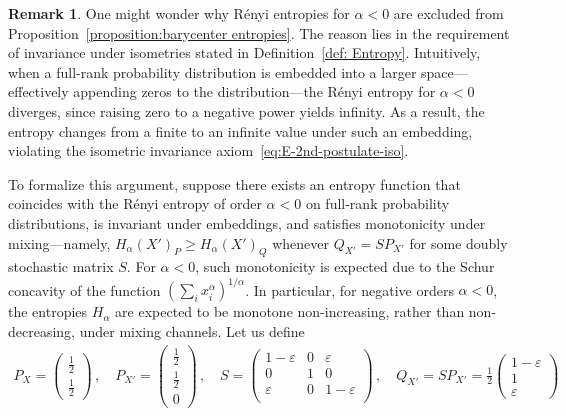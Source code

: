 \documentclass[aps,pra,11pt,onecolumn,nofootinbib,tightenlines]{revtex4-2}
\theoremstyle{definition}
\newtheorem{remark}[theorem]{Remark}
\begin{document}
\begin{remark}
\label{remark: negative alpha dilemma}
  One might wonder why Rényi entropies for $\alpha < 0$ are excluded from Proposition~\ref{proposition:barycenter entropies}. The reason lies in the requirement of invariance under isometries stated in Definition~\ref{def: Entropy}. Intuitively, when a full-rank probability distribution is embedded into a larger space—effectively appending zeros to the distribution—the Rényi entropy for $\alpha < 0$ diverges, since raising zero to a negative power yields infinity. As a result, the entropy changes from a finite to an infinite value under such an embedding, violating the isometric invariance axiom~\ref{eq:E-2nd-postulate-iso}.

To formalize this argument, suppose there exists an entropy function that coincides with the Rényi entropy of order $\alpha < 0$ on full-rank probability distributions, is invariant under embeddings, and satisfies monotonicity under mixing—namely, $H_\alpha(X')_P \geq H_\alpha(X')_Q$ whenever $Q_{X'} = S P_{X'}$ for some doubly stochastic matrix $S$. For $\alpha < 0$, such monotonicity is expected due to the Schur concavity of the function $\left( \sum_i x_i^\alpha \right)^{1/\alpha}$. In particular, for negative orders $\alpha<0$, the entropies $H_\alpha$ are expected to be monotone non-increasing, rather than non-decreasing, under mixing channels.
 Let us define
    \begin{align}
    P_X=\begin{pmatrix}
        \frac{1}{2} \\
        \frac{1}{2}
    \end{pmatrix} \,, \quad
    P_{X'}=\begin{pmatrix}
        \frac{1}{2} \\
        \frac{1}{2}  \\
        0
    \end{pmatrix} 
\,,\quad S=\begin{pmatrix}
            1-\varepsilon & 0 & \varepsilon \\
            0& 1 & 0\\
            \varepsilon & 0 & 1-\varepsilon \\
        \end{pmatrix} \,, \quad 
       Q_{X'} = SP_{X'} = \frac{1}{2}
       \begin{pmatrix}
           1-\varepsilon\\
           1\\
           \varepsilon

\end{pmatrix}
\end{align}
\end{remark}
\end{document}
